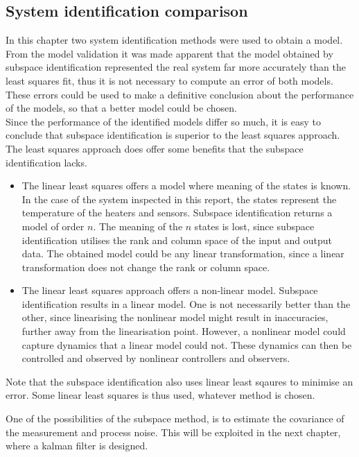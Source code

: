 \subsection{System identification comparison}
In this chapter two system identification methods were used to obtain a model. From the model validation it was made apparent that the model obtained by subspace identification represented the real system far more accurately than the least squares fit, thus it is not necessary to compute an error of both models. These errors could be used to make a definitive conclusion about the performance of the models, so that a better model could be chosen.\\
Since the performance of the identified models differ so much, it is easy to conclude that subspace identification is superior to the least squares approach. The least squares approach does offer some benefits that the subspace identification lacks.
\begin{itemize}
    \item The linear least squares offers a model where meaning of the states is known. In the case of the system inspected in this report, the states represent the temperature of the heaters and sensors. Subspace identification returns a model of order $n$. The meaning of the $n$ states is lost, since subspace identification utilises the rank and column space of the input and output data. The obtained model could be any linear transformation, since a linear transformation does not change the rank or column space.
    \item The linear least squares approach offers a non-linear model. Subspace identification results in a linear model. One is not necessarily better than the other, since linearising the nonlinear model might result in inaccuracies, further away from the linearisation point. However, a nonlinear model could capture dynamics that a linear model could not. These dynamics can then be controlled and observed by nonlinear controllers and observers.
\end{itemize}
Note that the subspace identification also uses linear least sqaures to minimise an error. Some linear least squares is thus used, whatever method is chosen.

One of the possibilities of the subspace method, is to estimate the covariance of the measurement and process noise. This will be exploited in the next chapter, where a kalman filter is designed.
